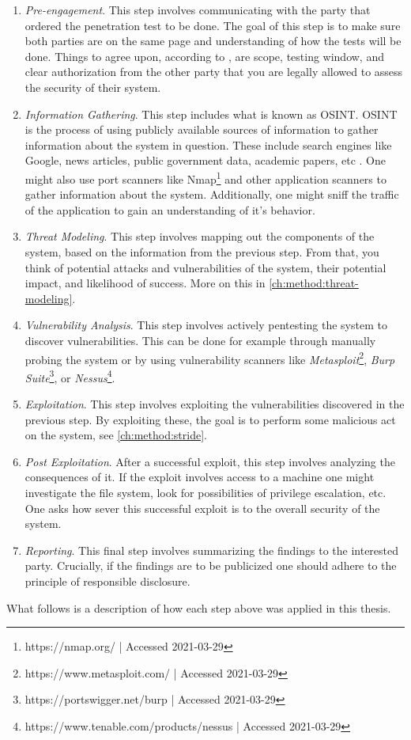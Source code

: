 \begin{enumerate}
    \item \textit{Pre-engagement}. This step involves communicating with the party that ordered the penetration test to be done. The goal of this step is to make sure both parties are on the same page and understanding of how the tests will be done. Things to agree upon, according to \citeauthor{weidman2014}, are scope, testing window, and clear authorization from the other party that you are legally allowed to assess the security of their system.
    \item \textit{Information Gathering}. This step includes what is known as \gls{OSINT}. \gls{OSINT} is the process of using publicly available sources of information to gather information about the system in question. These include search engines like Google, news articles, public government data, academic papers, etc \cite{steele2007open}. One might also use port scanners like Nmap\footnote{https://nmap.org/ | Accessed 2021-03-29} and other application scanners to gather information about the system. Additionally, one might sniff the traffic of the application to gain an understanding of it's behavior.
    \item \textit{Threat Modeling}. This step involves mapping out the components of the system, based on the information from the previous step. From that, you think of potential attacks and vulnerabilities of the system, their potential impact, and likelihood of success. More on this in \ref{ch:method:threat-modeling}.
    \item \textit{Vulnerability Analysis}. This step involves actively pentesting the system to discover vulnerabilities. This can be done for example through manually probing the system or by using vulnerability scanners like \textit{Metasploit}\footnote{https://www.metasploit.com/ | Accessed 2021-03-29}, \textit{Burp Suite}\footnote{https://portswigger.net/burp | Accessed 2021-03-29}, or \textit{Nessus}\footnote{https://www.tenable.com/products/nessus | Accessed 2021-03-29}.
    \item \textit{Exploitation}. This step involves exploiting the vulnerabilities discovered in the previous step. By exploiting these, the goal is to perform some malicious act on the system, see \ref{ch:method:stride}.
    \item \textit{Post Exploitation}. After a successful exploit, this step involves analyzing the consequences of it. If the exploit involves access to a machine one might investigate the file system, look for possibilities of privilege escalation, etc. One asks how sever this successful exploit is to the overall security of the system.
    \item \textit{Reporting}. This final step involves summarizing the findings to the interested party. Crucially, if the findings are to be publicized one should adhere to the principle of responsible disclosure.
\end{enumerate}
What follows is a description of how each step above was applied in this thesis.

